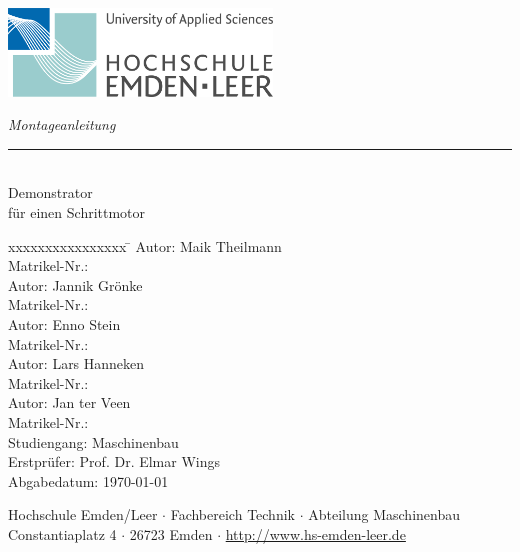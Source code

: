 %
%

\begin{titlepage}
    
    \begin{flushleft} 
        \includegraphics[width=7cm]{General/Logo_HS_Emden_Leer.jpg}
    \end{flushleft} 
    
    \begin{flushright}
        \vspace{2cm}
        \LARGE \textsl{Montageanleitung}\\
        \rule{0.6\textwidth}{0.4pt} ~\\
        \vspace{0.5cm}
        \textsf{\LARGE Demonstrator}\\
        \textsf{\LARGE für einen Schrittmotor}
    \end{flushright}
    
    \vspace{3cm}
    \large
    \begin{tabbing}
       xxxxxxxxxxxxxxxx \= \kill
       Autor:			\> Maik Theilmann \\
       Matrikel-Nr.:	 \\
       Autor:			\> Jannik Grönke \\
       Matrikel-Nr.:	 \\
       Autor:			\> Enno Stein \\
       Matrikel-Nr.:	 \\
       Autor:			\> Lars Hanneken \\
       Matrikel-Nr.:	 \\
       Autor:			\> Jan ter Veen \\
       Matrikel-Nr.:	 \\
       Studiengang: \> Maschinenbau \\ [0.5cm]
       Erstprüfer: \> Prof. Dr. Elmar Wings \\
        Abgabedatum: \> \today \\
    \end{tabbing}
    
    \vspace{3cm}
    \small
    \begin{center}
        Hochschule Emden/Leer $\cdot$ 
        Fachbereich Technik $\cdot$ 
        Abteilung Maschinenbau \\
        Constantiaplatz 4 $\cdot$ 
        26723 Emden $\cdot$ 
        \url{http://www.hs-emden-leer.de}
    \end{center}
    
\end{titlepage}
